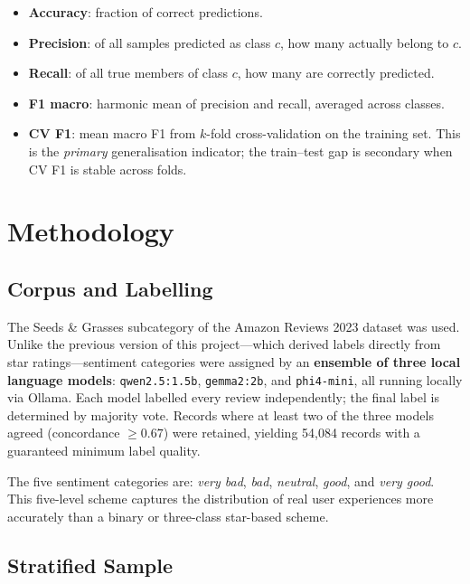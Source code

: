 \documentclass[12pt, letterpaper]{article}
\begin{document}
\begin{itemize}
  \item \textbf{Accuracy}: fraction of correct predictions.
  \item \textbf{Precision}: of all samples predicted as class $c$, how many
    actually belong to $c$.
  \item \textbf{Recall}: of all true members of class $c$, how many are
    correctly predicted.
  \item \textbf{F1 macro}: harmonic mean of precision and recall, averaged
    across classes.
  \item \textbf{CV F1}: mean macro F1 from $k$-fold cross-validation on the
    training set. This is the \emph{primary} generalisation indicator; the
    train--test gap is secondary when CV F1 is stable across folds.
\end{itemize}

\section{Methodology}

\subsection{Corpus and Labelling}

The Seeds \& Grasses subcategory of the Amazon Reviews 2023 dataset was used.
Unlike the previous version of this project---which derived labels directly
from star ratings---sentiment categories were assigned by an \textbf{ensemble
of three local language models}: \texttt{qwen2.5:1.5b}, \texttt{gemma2:2b},
and \texttt{phi4-mini}, all running locally via Ollama. Each model labelled
every review independently; the final label is determined by majority vote.
Records where at least two of the three models agreed (concordance $\geq 0.67$)
were retained, yielding 54,084 records with a guaranteed minimum label quality.

The five sentiment categories are:
\textit{very bad}, \textit{bad}, \textit{neutral}, \textit{good}, and
\textit{very good}.
This five-level scheme captures the distribution of real user experiences more
accurately than a binary or three-class star-based scheme.

\subsection{Stratified Sample}
\end{document}
